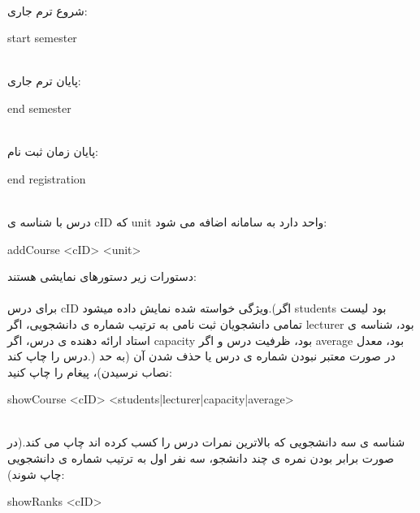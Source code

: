 \documentclass[]{article}
\begin{document}
\noindent
\\ شروع ترم جاری:
\begin{tcolorbox}[boxrule=0pt]
	\begin{latin}
  	  \large{
  	  	start semester
		}
	\end{latin}
\end{tcolorbox}
\noindent
\\پایان ترم جاری:
\begin{tcolorbox}[boxrule=0pt]
	\begin{latin}
  	  \large{
  	  	end semester
		}
	\end{latin}
\end{tcolorbox}
\noindent
\\پایان زمان ثبت نام:
\begin{tcolorbox}[boxrule=0pt]
	\begin{latin}
  	  \large{
  	  	end registration
		}
	\end{latin}
\end{tcolorbox}
\noindent
\\درس با شناسه ی cID  که unit واحد دارد به سامانه اضافه می شود:
\begin{tcolorbox}[boxrule=0pt]
	\begin{latin}
  	  \large{
  	  	addCourse <cID> <unit>
		}
	\end{latin}
\end{tcolorbox}
\newpage
دستورات زیر دستورهای نمایشی هستند:\\\\
\noindent
برای درس  cID ویژگی خواسته شده نمایش داده میشود.(اگر students بود لیست تمامی دانشجویان ثبت نامی به ترتیب شماره ی دانشجویی، اگر  lecturer بود، شناسه ی استاد ارائه دهنده ی درس، اگر capacity بود، ظرفیت درس و اگر  average  بود، معدل درس را چاپ کند.) در صورت معتبر نبودن شماره ی درس یا حذف شدن آن (به حد نصاب نرسیدن)، پیغام  را چاپ کنید:
\begin{tcolorbox}[boxrule=0pt]
	\begin{latin}
  	  \large{
  	  	showCourse <cID> <students|lecturer|capacity|average>
		}
	\end{latin}
\end{tcolorbox}
\noindent
\\شناسه ی سه دانشجویی که بالاترین نمرات درس را کسب کرده اند چاپ می کند.(در صورت برابر بودن نمره ی چند دانشجو، سه نفر اول به ترتیب شماره ی دانشجویی چاپ شوند):
\begin{tcolorbox}[boxrule=0pt]
	\begin{latin}
  	  \large{
  	  	showRanks <cID>
		}
	\end{latin}
\end{tcolorbox}
\end{document}
